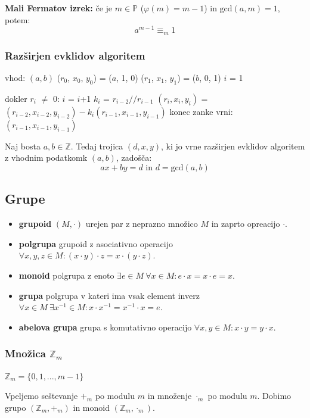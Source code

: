 \begin{multicols}{4}
\textbf{Mali Fermatov izrek:} če je $m \in \mathbb{P}$ ($\varphi(m) = m-1$) in $\textrm{gcd}(a,m) = 1$, potem:
\[a^{m-1} \equiv_m 1\]

\subsubsection*{Razširjen evklidov algoritem}

\begin{koda}
vhod: $(a, b)$
($r_0$, $x_0$, $y_0$) = ($a$, 1, 0)
($r_1$, $x_1$, $y_1$) = ($b$, 0, 1)
$i$ = 1

dokler $r_i$ $\neq$ 0:
    $i$ = $i$+1
    $k_i$ = $r_{i-2} // r_{i-1}$
    $(r_i, x_i, y_i)$ = $(r_{i-2}, x_{i-2}, y_{i-2}) - k_i(r_{i-1}, x_{i-1}, y_{i-1})$
konec zanke
vrni: $(r_{i-1}, x_{i-1}, y_{i-1})$
\end{koda}

Naj bosta $a, b \in \mathbb{Z}$. Tedaj trojica $(d, x, y)$, ki jo vrne razširjen evklidov algoritem z vhodnim podatkomk $(a, b)$, zadošča:
\[ax + by = d \text{ in } d = \textrm{gcd}(a, b)\] 


\subsection*{Grupe}
\begin{itemize}
    \item \textbf{grupoid} $(M, \cdot)$ urejen par z neprazno množico $M$ in zaprto opreacijo $\cdot$.
    \item \textbf{polgrupa} grupoid z asociativno operacijo $ \forall x,y,z \in M : (x\cdot y)\cdot z = x\cdot (y\cdot z)$.
    \item \textbf{monoid} polgrupa z enoto $ \exists e \in M \ \forall x \in M : e\cdot x = x\cdot e = x$.
    \item \textbf{grupa} polgrupa v kateri ima vsak element inverz $ \forall x \in M \ \exists x^{-1} \in M : x\cdot x^{-1} = x^{-1}\cdot x = e$.
    \item \textbf{abelova grupa} grupa s komutativno operacijo $ \forall x,y \in M  : x\cdot y = y\cdot x$.
\end{itemize} 

\subsubsection{Množica $\mathbb{Z}_m$}
$\mathbb{Z}_m = \{0,1,...,m-1\}$

Vpeljemo seštevanje $+_m$ po modulu $m$ in množenje $\cdot_m$ po modulu $m$. 
Dobimo grupo $(\mathbb{Z}_m, +_m)$ in monoid $(\mathbb{Z}_m, \cdot_m)$.


\end{multicols}

